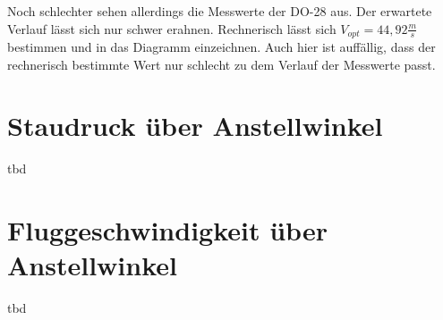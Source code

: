 Noch schlechter sehen allerdings die Messwerte der DO-28 aus. Der erwartete Verlauf lässt sich nur schwer erahnen. Rechnerisch lässt sich $V_{opt} = 44,92 \frac{m}{s}$
bestimmen und in das Diagramm einzeichnen. Auch hier ist auffällig, dass der rechnerisch bestimmte Wert nur schlecht zu dem Verlauf der Messwerte passt.
\section{Staudruck über Anstellwinkel}
tbd

\section{Fluggeschwindigkeit über Anstellwinkel}
tbd